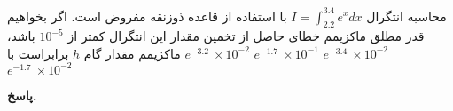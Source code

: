 محاسبه انتگرال 
\(I = \int_{2.2}^{3.4} e^x dx\)
با استفاده از قاعده ذوزنقه مفروض است. اگر بخواهیم قدر مطلق ماکزیمم خطای حاصل از تخمین مقدار این انتگرال   کمتر از 
\(10^{-5}\)
باشد، ماکزیمم مقدار گام 
\(h\)
برابراست با
 \mulchoice
	{\(e^{-3.2}\ \times 10^{-2}\)}
	{\(e^{-1.7}\ \times 10^{-1}\)}
	{\(e^{-3.4}\ \times 10^{-2}\)}
	{\(e^{-1.7}\ \times 10^{-2}\)}

\begin{answer}

	\textbf{پاسخ.}
	
\end{answer}
